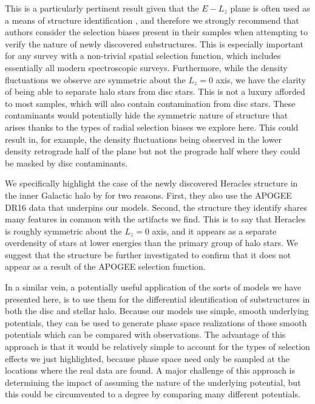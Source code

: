 This is a particularly pertinent result given that the $E-L_{z}$ plane is often used as a means of structure identification \citep[e.g.][]{helmi18,koppelman19b,horta21}, and therefore we strongly recommend that authors consider the selection biases present in their samples when attempting to verify the nature of newly discovered substructures. This is especially important for any survey with a non-trivial spatial selection function, which includes essentially all modern spectroscopic surveys. Furthermore, while the density fluctuations we observe are symmetric about the $L_{z}=0$ axis, we have the clarity of being able to separate halo stars from disc stars. This is not a luxury afforded to most samples, which will also contain contamination from disc stars. These contaminants would potentially hide the symmetric nature of structure that arises thanks to the types of radial selection biases we explore here. This could result in, for example, the density fluctuations being observed in the lower density retrograde half of the plane but not the prograde half where they could be masked by disc contaminants.

We specifically highlight the case of the newly discovered Heracles structure in the inner Galactic halo by \citet{horta21} for two reasons. First, they also use the APOGEE DR16 data that underpins our models. Second, the structure they identify shares many features in common with the artifacts we find. This is to say that Heracles is roughly symmetric about the $L_{z}=0$ axis, and it appears as a separate overdensity of stars at lower energies than the primary group of halo stars. We suggest that the structure be further investigated to confirm that it does not appear as a result of the APOGEE selection function.

In a similar vein, a potentially useful application of the sorts of models we have presented here, is to use them for the differential identification of substructures in both the disc and stellar halo. Because our models use simple, smooth underlying potentials, they can be used to generate phase space realizations of those smooth potentials which can be compared with observations. The advantage of this approach is that it would be relatively simple to account for the types of selection effects we just highlighted, because phase space need only be sampled at the locations where the real data are found. A major challenge of this approach is determining the impact of assuming the nature of the underlying potential, but this could be circumvented to a degree by comparing many different potentials.

